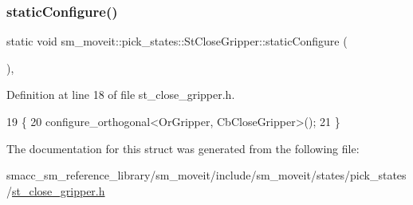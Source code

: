 \subsubsection{\texorpdfstring{static\+Configure()}{staticConfigure()}}
{\footnotesize\ttfamily static void sm\+\_\+moveit\+::pick\+\_\+states\+::\+St\+Close\+Gripper\+::static\+Configure (\begin{DoxyParamCaption}{ }\end{DoxyParamCaption})\hspace{0.3cm}{\ttfamily [inline]}, {\ttfamily [static]}}



Definition at line 18 of file st\+\_\+close\+\_\+gripper.\+h.


\begin{DoxyCode}
19    \{
20       configure\_orthogonal<OrGripper, CbCloseGripper>();
21    \}
\end{DoxyCode}


The documentation for this struct was generated from the following file\+:\begin{DoxyCompactItemize}
\item 
smacc\+\_\+sm\+\_\+reference\+\_\+library/sm\+\_\+moveit/include/sm\+\_\+moveit/states/pick\+\_\+states/\hyperlink{sm__moveit_2include_2sm__moveit_2states_2pick__states_2st__close__gripper_8h}{st\+\_\+close\+\_\+gripper.\+h}\end{DoxyCompactItemize}
